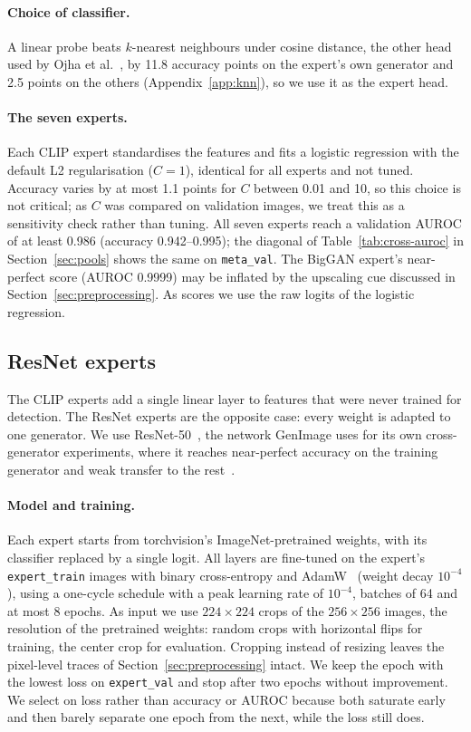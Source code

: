 \documentclass[10pt,a4paper]{article}
\begin{document}
\paragraph{Choice of classifier.}
A linear probe beats $k$-nearest neighbours under cosine distance, the other head used by Ojha et al.~\cite{ojha2023universal}, by 11.8 accuracy points on the expert's own generator and 2.5 points on the others (Appendix~\ref{app:knn}), so we use it as the expert head.

\paragraph{The seven experts.}
Each CLIP expert standardises the features and fits a logistic regression with the default L2 regularisation ($C=1$), identical for all experts and not tuned. Accuracy varies by at most 1.1 points for $C$ between 0.01 and 10, so this choice is not critical; as $C$ was compared on validation images, we treat this as a sensitivity check rather than tuning. All seven experts reach a validation AUROC of at least 0.986 (accuracy 0.942--0.995); the diagonal of Table~\ref{tab:cross-auroc} in Section~\ref{sec:pools} shows the same on \texttt{meta\_val}. The BigGAN expert's near-perfect score (AUROC 0.9999) may be inflated by the upscaling cue discussed in Section~\ref{sec:preprocessing}. As scores we use the raw logits of the logistic regression.

\subsection{ResNet experts}\label{sec:resnet}

The CLIP experts add a single linear layer to features that were never trained for detection. The ResNet experts are the opposite case: every weight is adapted to one generator. We use ResNet-50~\cite{he2016resnet}, the network GenImage uses for its own cross-generator experiments, where it reaches near-perfect accuracy on the training generator and weak transfer to the rest~\cite{zhu2023genimage}.

\paragraph{Model and training.}
Each expert starts from torchvision's ImageNet-pretrained weights, with its classifier replaced by a single logit. All layers are fine-tuned on the expert's \texttt{expert\_train} images with binary cross-entropy and AdamW~\cite{loshchilov2019adamw} (weight decay $10^{-4}$), using a one-cycle schedule with a peak learning rate of $10^{-4}$, batches of 64 and at most 8 epochs. As input we use $224\times224$ crops of the $256\times256$ images, the resolution of the pretrained weights: random crops with horizontal flips for training, the center crop for evaluation. Cropping instead of resizing leaves the pixel-level traces of Section~\ref{sec:preprocessing} intact. We keep the epoch with the lowest loss on \texttt{expert\_val} and stop after two epochs without improvement. We select on loss rather than accuracy or AUROC because both saturate early and then barely separate one epoch from the next, while the loss still does.
\end{document}
